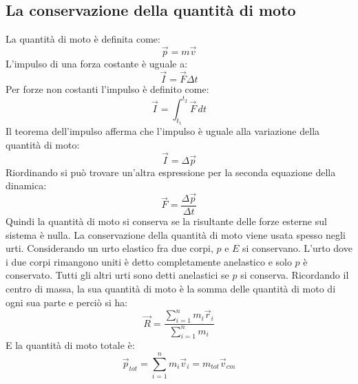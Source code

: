 \documentclass{article}
\begin{document}
\subsection{La conservazione della quantità di moto}
La quantità di moto è definita come:
\begin{equation}
    \vec{p}=m\vec{v}
\end{equation}
L'impulso di una forza costante è uguale a:
\begin{equation}
    \Vec{I}=\Vec{F}\Delta t
\end{equation}
Per forze non costanti l'impulso è definito come:
\begin{equation}
    \Vec{I}=\int_{t_1}^{t_2} \Vec{F}\, dt
\end{equation}
Il teorema dell'impulso afferma che l'impulso è uguale alla variazione della quantità di moto:
\begin{equation}
    \Vec{I}=\Delta \Vec{p}
\end{equation}
Riordinando si può trovare un'altra espressione per la seconda equazione della dinamica:
\begin{equation}
    \Vec{F}=\frac{\Delta \Vec{p}}{\Delta t}
\end{equation}
Quindi la quantità di moto si conserva se la risultante delle forze esterne sul sistema è nulla.
La conservazione della quantità di moto viene usata spesso negli urti. 
Considerando un urto elastico fra due corpi, $p$ e $E$ si conservano.
L'urto dove i due corpi rimangono uniti è detto completamente anelastico e solo $p$ è conservato.
Tutti gli altri urti sono detti anelastici se $p$ si conserva.
Ricordando il centro di massa, la sua quantità di moto è la somma delle quantità di moto di ogni sua parte e perciò si ha:
\begin{equation}
    \Vec{R}=\frac{\sum_{i=1}^n m_i \Vec{r}_i}{\sum_{i=1}^n m_i}
\end{equation}
E la quantità di moto totale è:
\begin{equation}
    \Vec{p}_{tot}=\sum_{i=1}^n m_i \Vec{v}_i = m_{tot} \Vec{v}_{cm}
\end{equation}
\end{document}
